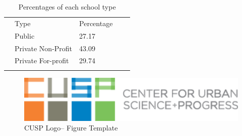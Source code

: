 \documentclass[10pt,twocolumn]{article}
\begin{document}
\begin{table}[]
\centering
\caption{Percentages of each school type}
\label{my-label}
\begin{tabular}{lllll}
& Type                & Percentage &\\
& Public              & 27.17            & \\
& Private Non-Profit  & 43.09    & \\
& Private For-profit  & 29.74  & \\
                &                           &
\end{tabular}
\end{table}

\begin{figure}[!t]
  \begin{center}
    \includegraphics[width=6in]{cusp-index.png}
  \end{center}

  \caption{\small CUSP Logo-- Figure Template}
  \label{fig-1}
\end{figure}
\end{document}
